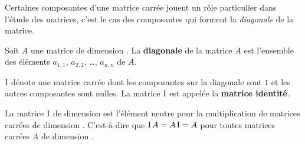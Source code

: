 {Certaines composantes d'une matrice carrée jouent un rôle particulier
dans l'étude des matrices, c'est le cas des composantes qui forment la
{\em diagonale} de la matrice. 

\begin{focus}{\dfn} 
Soit $A$ une matrice de dimension \nn.  La {\bfseries diagonale} de la
matrice $A$ est l'ensemble des éléments $a_{1,1}$, $a_{2,2}$, \ldots,
$a_{n,n}$ de $A$.
\end{focus}

\begin{focus}{\dfn} 
$\operatorname{I}$ dénote une matrice carrée dont les composantes sur la diagonale sont
$1$ et les autres composantes sont nulles.  La matrice $\operatorname{I}$ est appelée la
{\bfseries matrice identité}.
\end{focus}

\begin{focus}{\prp}
La matrice $\operatorname{I}$ de dimension \nn est l'élément neutre pour la
multiplication de matrices carrées de dimension \nn.  C'est-à-dire que
$\operatorname{I} A = A \operatorname{I} = A$ pour toutes matrices carrées $A$ de dimension
\nn.
\end{focus}

}
